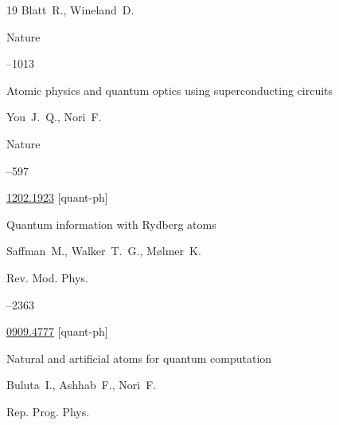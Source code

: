 \begin{thebibliography}{19}
\by  Blatt~R.,  Wineland~D.

\jour Nature




--1013





\paper Atomic physics and quantum optics using superconducting circuits

\by  You~J.~Q., Nori~F.

\jour Nature




--597


\arxiv \href{http://arxiv.org/abs/1202.1923}{1202.1923} [quant-ph]








\paper  Quantum information with Rydberg atoms 

\by  Saffman~M., Walker~T.~G.,  M{\o}lmer~K.

\jour Rev. Mod. Phys.




--2363


\arxiv \href{http://arxiv.org/abs/0909.4777}{0909.4777} [quant-ph]




\paper Natural and artificial atoms for quantum computation

\by Buluta~I., Ashhab~F., Nori~F.

\jour Rep. Prog. Phys.







\end{thebibliography}
